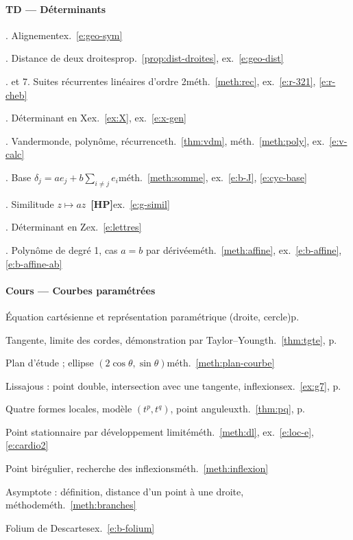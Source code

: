 \documentclass[a4paper,11pt]{article}
\numberwithin{equation}{section}
\numberwithin{figure}{section}
\numberwithin{table}{section}
\theoremstyle{enonce}
\theoremstyle{exemple}
\theoremstyle{remarque}
\newcommand{\HP}{\,{\sffamily\bfseries\scriptsize\textcolor{Brique}{[HP]}}}
\begin{document}
{\paragraph{TD --- Déterminants}
. Alignement\dotfill ex.~\ref{e:geo-sym}\par
{}. Distance de deux droites\dotfill prop.~\ref{prop:dist-droites}, ex.~\ref{e:geo-dist}\par
{}. et 7. Suites récurrentes linéaires d'ordre 2\dotfill méth.~\ref{meth:rec}, ex.~\ref{e:r-321}, \ref{e:r-cheb}\par
{}. Déterminant en X\dotfill ex.~\ref{ex:X}, ex.~\ref{e:x-gen}\par
{}. Vandermonde, polynôme, récurrence\dotfill th.~\ref{thm:vdm}, méth.~\ref{meth:poly}, ex.~\ref{e:v-calc}\par
{}. Base $\delta_j=ae_j+b\sum_{i\neq j}e_i$\dotfill méth.~\ref{meth:somme}, ex.~\ref{e:b-J}, \ref{e:cyc-base}\par
{}. Similitude $z\mapsto az$ \HP\dotfill ex.~\ref{e:g-simil}\par
{}. Déterminant en Z\dotfill ex.~\ref{e:lettres}\par
{}. Polynôme de degré 1, cas $a=b$ par dérivée\dotfill méth.~\ref{meth:affine}, ex.~\ref{e:b-affine}, \ref{e:b-affine-ab}\par
\paragraph{Cours --- Courbes paramétrées}
\noindent Équation cartésienne et représentation paramétrique (droite, cercle)\dotfill p.~\pageref{thm:tgte}\par
\noindent Tangente, limite des cordes, démonstration par Taylor--Young\dotfill th.~\ref{thm:tgte}, p.~\pageref{thm:tgte}\par
\noindent Plan d'étude ; ellipse $(2\cos\theta,\sin\theta)$\dotfill méth.~\ref{meth:plan-courbe}\par
\noindent Lissajous : point double, intersection avec une tangente, inflexions\dotfill ex.~\ref{ex:g7}, p.~\pageref{ex:g7}\par
\noindent Quatre formes locales, modèle $(t^p,t^q)$, point anguleux\dotfill th.~\ref{thm:pq}, p.~\pageref{fig:pq}\par
\noindent Point stationnaire par développement limité\dotfill méth.~\ref{meth:dl}, ex.~\ref{e:loc-e}, \ref{e:cardio2}\par
\noindent Point birégulier, recherche des inflexions\dotfill méth.~\ref{meth:inflexion}\par
\noindent Asymptote : définition, distance d'un point à une droite, méthode\dotfill méth.~\ref{meth:branches}\par
\noindent Folium de Descartes\dotfill ex.~\ref{e:b-folium}\par
}
\end{document}
